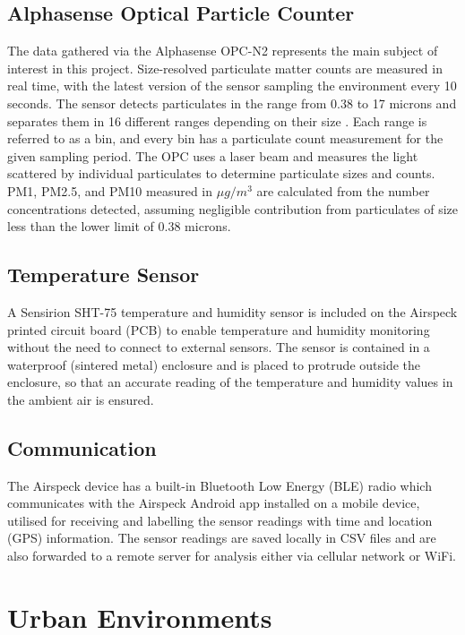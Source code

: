 \documentclass[bsc,frontabs,twoside,singlespacing, parskip,deptreport]{infthesis}     %
\begin{document}
\subsection*{Alphasense Optical Particle Counter}

The data gathered via the Alphasense OPC-N2 \cite{opc} represents the main subject of interest in this project. Size-resolved particulate matter counts are measured in real time, with the latest version of the sensor sampling the environment every 10 seconds. The sensor detects particulates in the range from 0.38 to 17 microns and separates them in 16 different ranges depending on their size \cite{airspeck}. Each range is referred to as a bin, and every bin has a particulate count measurement for the given sampling period. The OPC uses a laser beam and measures the light scattered by individual particulates to determine particulate sizes and counts. PM1, PM2.5, and PM10 measured in $ \mu g /m^3 $ are calculated from the number concentrations detected, assuming negligible contribution from particulates of size less than the lower limit of 0.38 microns.


\subsection*{Temperature Sensor}

A Sensirion SHT-75 temperature and humidity sensor \cite{sensirion} is included on the Airspeck printed circuit board (PCB) to enable temperature and humidity monitoring without the need to connect to external sensors. The sensor is contained in a waterproof (sintered metal) enclosure \cite{airspeck} and is placed to protrude outside the enclosure, so that an accurate reading of the temperature and humidity values in the ambient air is ensured.


\subsection*{Communication}

The Airspeck device has a built-in Bluetooth Low Energy (BLE) radio which communicates with the Airspeck Android app installed on a mobile device, utilised for receiving and labelling the sensor readings with time and location (GPS) information. The sensor readings are saved locally in CSV files and are also forwarded to a remote server for analysis either via cellular network or WiFi.


\section{Urban Environments}
\label{sec:urban-environments}
\end{document}
